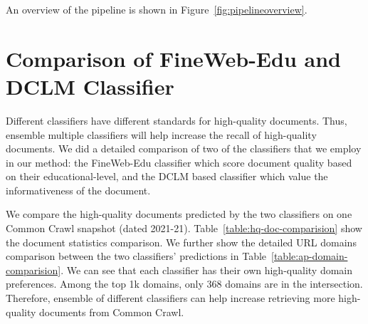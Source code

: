 \documentclass[11pt]{article}
\begin{document}
An overview of the pipeline is shown in Figure~\ref{fig:pipelineoverview}.

\section{Comparison of FineWeb-Edu and DCLM Classifier}
\label{sec:appendix-1}
Different classifiers have different standards for high-quality documents. Thus, ensemble multiple classifiers will help increase the recall of high-quality documents. We did a detailed comparison of two of the classifiers that we employ in our method: the FineWeb-Edu classifier which score document quality based on their educational-level, and the DCLM based classifier which value the informativeness of the document. 

We compare the high-quality documents predicted by the two classifiers on one Common Crawl snapshot (dated 2021-21). Table~\ref{table:hq-doc-comparision} show the document statistics comparison. We further show the detailed URL domains comparison between the two classifiers' predictions in Table~\ref{table:ap-domain-comparision}. We can see that each classifier has their own high-quality domain preferences. Among the top 1k domains, only 368 domains are in the intersection. Therefore, ensemble of different classifiers can help increase retrieving more high-quality documents from Common Crawl.
\end{document}
